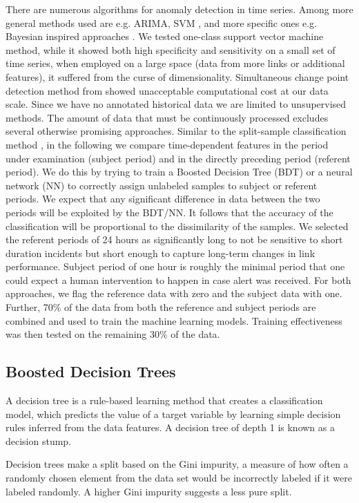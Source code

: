 \documentclass[5p]{elsarticle}
\begin{document}
There are numerous algorithms for anomaly detection in time series. Among more general methods used are e.g. ARIMA\cite{seventeen}, SVM \cite{eighteen}, and more specific ones e.g. Bayesian inspired approaches \cite{ten}. We tested one-class support vector machine method, while it showed both high specificity and sensitivity on a small set of time series, when employed on a large space (data from more links or additional features), it suffered from the curse of dimensionality. Simultaneous change point detection method from \cite{ten} showed unacceptable computational cost at our data scale.
Since we have no annotated historical data we are limited to unsupervised methods. The amount of data that must be continuously processed excludes several otherwise promising approaches. 
Similar to the split-sample classification method \cite{six}, in the following we compare time-dependent features in the period under examination (subject period) and in the directly preceding period (referent period). We do this by trying to train a Boosted Decision Tree (BDT)\cite{eleven} or a neural network (NN) to correctly assign unlabeled samples to subject or referent periods.  We expect that any significant difference in data between the two periods will be exploited by the BDT/NN. It follows that the accuracy of the classification will be proportional to the dissimilarity of the samples. We selected the referent periods of 24 hours as significantly long to not be sensitive to short duration incidents but short enough to capture long-term changes in link performance. Subject period of one hour is roughly the minimal period that one could expect a human intervention to happen in case alert was received. For both approaches, we flag the reference data with zero and the subject data with one.  Further, 70\% of the data from both the reference and subject periods are combined and used to train the machine learning models. Training effectiveness was then tested on the remaining 30\% of the data.

\subsection{Boosted Decision Trees}

A decision tree is a rule-based learning method \cite{two} that creates a classification model, which predicts the value of a target variable by learning simple decision rules inferred from the data features. A decision tree of depth 1 is known as a decision stump.

Decision trees make a split based on the Gini impurity, a measure of how often a randomly chosen element from the data set would be incorrectly labeled if it were labeled randomly. A higher Gini impurity suggests a less pure split.
\end{document}
